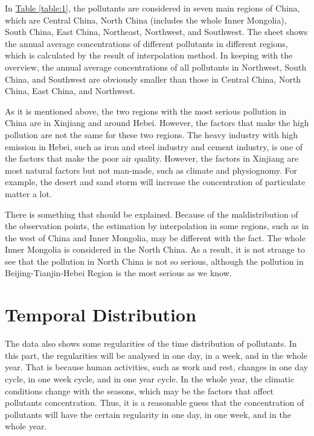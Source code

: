 \documentclass[letterpaper]{article}
\begin{document}
\begin{CJK*}{UTF8}{gkai}
In \hyperref[table:1]{Table \ref*{table:1}}, the pollutants are considered in seven main regions of China, which are Central China, North China (includes the whole Inner Mongolia), South China, East China, Northeast, Northwest, and Southwest. The sheet shows the annual average concentrations of different pollutants in different regions, which is calculated by the result of interpolation method. In keeping with the overview, the annual average concentrations of all pollutants in Northwest, South China, and Southwest are obviously smaller than those in Central China, North China, East China, and Northwest.

As it is mentioned above, the two regions with the most serious pollution in China are in Xinjiang and around Hebei. However, the factors that make the high pollution are not the same for these two regions. The heavy industry with high emission in Hebei, such as iron and steel industry and cement industry, is one of the factors that make the poor air quality. However, the factors in Xinjiang are most natural factors but not man-made, such as climate and physiognomy. For example, the desert and sand storm will increase the concentration of particulate matter a lot.

There is something that should be explained. Because of the maldistribution of the observation points, the estimation by interpolation in some regions, such as in the west of China and Inner Mongolia, may be different with the fact. The whole Inner Mongolia is considered in the North China. As a result, it is not strange to see that the pollution in North China is not so serious, although the pollution in Beijing-Tianjin-Hebei Region is the most serious as we know.

\section{Temporal Distribution}

The data also shows some regularities of the time distribution of pollutants. In this part, the regularities will be analysed in one day, in a week, and in the whole year. That is because human activities, such as work and rest, changes in one day cycle, in one week cycle, and in one year cycle. In the whole year, the climatic conditions change with the seasons, which may be the factors that affect pollutants concentration. Thus, it is a reasonable guess that the concentration of pollutants will have the certain regularity in one day, in one week, and in the whole year.


\end{CJK*}
\end{document}
